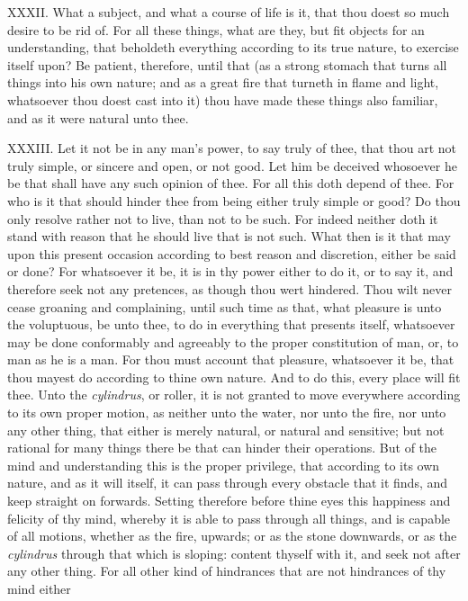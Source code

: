 XXXII. What a subject, and what a course of life is it, that thou doest
so much desire to be rid of. For all these things, what are they, but fit
objects for an understanding, that beholdeth everything according to its
true nature, to exercise itself upon? Be patient, therefore, until that
(as a strong stomach that turns all things into his own nature; and as a
great fire that turneth in flame and light, whatsoever thou doest cast
into it) thou have made these things also familiar, and as it were natural
unto thee.

XXXIII. Let it not be in any man's power, to say truly of thee, that thou
art not truly simple, or sincere and open, or not good. Let him be
deceived whosoever he be that shall have any such opinion of thee. For
all this doth depend of thee. For who is it that should hinder thee from
being either truly simple or good? Do thou only resolve rather not to
live, than not to be such. For indeed neither doth it stand with reason
that he should live that is not such. What then is it that may upon this
present occasion according to best reason and discretion, either be said
or done? For whatsoever it be, it is in thy power either to do it, or to
say it, and therefore seek not any pretences, as though thou wert
hindered. Thou wilt never cease groaning and complaining, until such time
as that, what pleasure is unto the voluptuous, be unto thee, to do in
everything that presents itself, whatsoever may be done conformably and
agreeably to the proper constitution of man, or, to man as he is a man.
For thou must account that pleasure, whatsoever it be, that thou mayest
do according to thine own nature. And to do this, every place will fit
thee. Unto the \emph{cylindrus}, or roller, it is not granted to move
everywhere according to its own proper motion, as neither unto the water,
nor unto the fire, nor unto any other thing, that either is merely
natural, or natural and sensitive; but not rational for many things there
be that can hinder their operations. But of the mind and understanding
this is the proper privilege, that according to its own nature, and as it
will itself, it can pass through every obstacle that it finds, and keep
straight on forwards. Setting therefore before thine eyes this happiness
and felicity of thy mind, whereby it is able to pass through all things,
and is capable of all motions, whether as the fire, upwards; or as the
stone downwards, or as the \emph{cylindrus} through that which is
sloping: content thyself with it, and seek not after any other thing. For
all other kind of hindrances that are not hindrances of thy mind either
